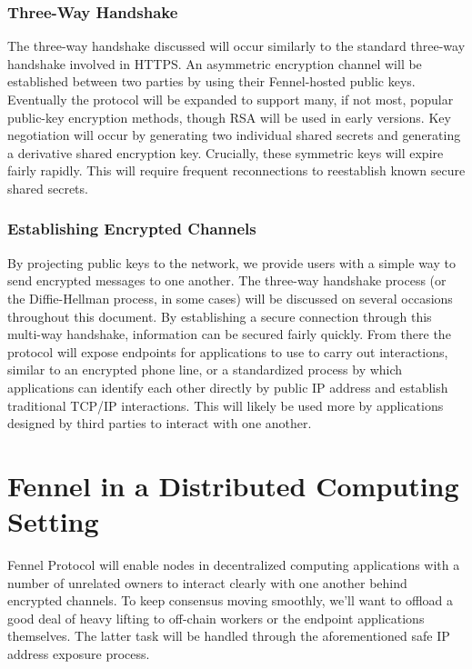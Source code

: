 \documentclass[]{article}
\begin{document}
\subsubsection{Three-Way Handshake}
\label{scrivauto:19}

The three-way handshake discussed will occur similarly to the standard three-way handshake involved in HTTPS. An asymmetric encryption channel will be established between two parties by using their Fennel-hosted public keys. Eventually the protocol will be expanded to support many, if not most, popular public-key encryption methods, though RSA will be used in early versions. Key negotiation will occur by generating two individual shared secrets and generating a derivative shared encryption key.
Crucially, these symmetric keys will expire fairly rapidly. This will require frequent reconnections to reestablish known secure shared secrets.

\subsubsection{Establishing Encrypted Channels}
\label{scrivauto:20}

By projecting public keys to the network, we provide users with a simple way to send encrypted messages to one another. The three-way handshake process (or the Diffie-Hellman process, in some cases) will be discussed on several occasions throughout this document. By establishing a secure connection through this multi-way handshake, information can be secured fairly quickly. From there the protocol will expose endpoints for applications to use to carry out interactions, similar to an encrypted phone line, or a standardized process by which applications can identify each other directly by public IP address and establish traditional TCP/IP interactions. This will likely be used more by applications designed by third parties to interact with one another.

\section{Fennel in a Distributed Computing Setting}
\label{scrivauto:21}

Fennel Protocol will enable nodes in decentralized computing applications with a number of unrelated owners to interact clearly with one another behind encrypted channels. To keep consensus moving smoothly, we'll want to offload a good deal of heavy lifting to off-chain workers or the endpoint applications themselves. The latter task will be handled through the aforementioned safe IP address exposure process.
\end{document}
